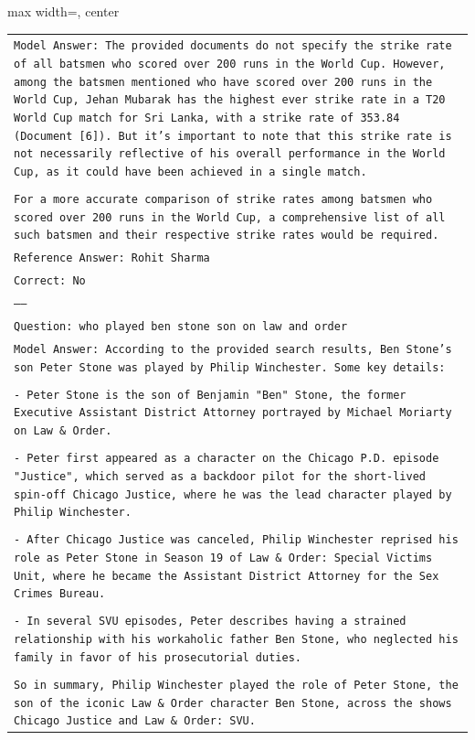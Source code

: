 \documentclass[11pt]{article}
\begin{document}
\begin{table}[ht]
\begin{adjustbox}{max width=\textwidth, center}
\begin{tabular}{>{\raggedright\arraybackslash\tt}p{}<{}}
Model Answer: The provided documents do not specify the strike rate of all batsmen who scored over 200 runs in the World Cup. However, among the batsmen mentioned who have scored over 200 runs in the World Cup, Jehan Mubarak has the highest ever strike rate in a T20 World Cup match for Sri Lanka, with a strike rate of 353.84 (Document [6]). But it's important to note that this strike rate is not necessarily reflective of his overall performance in the World Cup, as it could have been achieved in a single match.\\
\\
For a more accurate comparison of strike rates among batsmen who scored over 200 runs in the World Cup, a comprehensive list of all such batsmen and their respective strike rates would be required.\\
Reference Answer: Rohit Sharma\\
Correct: No\\
-----\\
Question: who played ben stone son on law and order\\
Model Answer: According to the provided search results, Ben Stone's son Peter Stone was played by Philip Winchester. Some key details:\\
\\
- Peter Stone is the son of Benjamin "Ben" Stone, the former Executive Assistant District Attorney portrayed by Michael Moriarty on Law \& Order.\\
\\
- Peter first appeared as a character on the Chicago P.D. episode "Justice", which served as a backdoor pilot for the short-lived spin-off Chicago Justice, where he was the lead character played by Philip Winchester. \\
\\
- After Chicago Justice was canceled, Philip Winchester reprised his role as Peter Stone in Season 19 of Law \& Order: Special Victims Unit, where he became the Assistant District Attorney for the Sex Crimes Bureau.\\
\\
- In several SVU episodes, Peter describes having a strained relationship with his workaholic father Ben Stone, who neglected his family in favor of his prosecutorial duties.\\
\\
So in summary, Philip Winchester played the role of Peter Stone, the son of the iconic Law \& Order character Ben Stone, across the shows Chicago Justice and Law \& Order: SVU.\\

\end{tabular}
\end{adjustbox}
\end{table}
\end{document}
